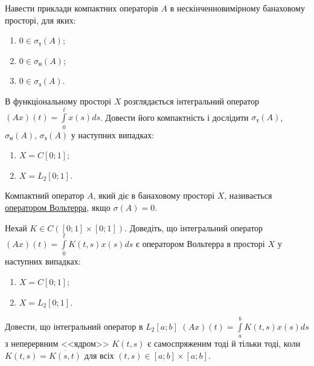 \begin{exercise}
    Навести приклади компактних операторів $A$ в нескінченновимірному
    банаховому просторі, для яких:
    \begin{enumerate}
        \item $0 \in \sigma_{\text{т}} (A)$;
        \item $0 \in \sigma_{\text{н}} (A)$;
        \item $0 \in \sigma_{\text{з}} (A)$.
    \end{enumerate}
\end{exercise}

\begin{exercise}
    В функціональному просторі $X$ розглядається інтегральний оператор 
    $(Ax)(t) = \int\limits_0^t x(s) ds$. Довести його компактність і дослідити
    $\sigma_{\text{т}} (A)$, $\sigma_{\text{н}} (A)$, $\sigma_{\text{з}} (A)$
    у наступних випадках:
    \begin{enumerate}
        \item $X = C[0;1]$;
        \item $X = L_2 [0;1]$.
    \end{enumerate}
\end{exercise}

\begin{theory}
    Компактний оператор $A$, який діє в банаховому просторі $X$, називається
    \ul{оператором Вольтерра}, якщо $\sigma(A) = 0$.
\end{theory}

\begin{exercise}
    Нехай $K \in C([0;1] \times [0;1])$. Доведіть, що інтегральний оператор
    $(Ax)(t) = \int\limits_0^t K(t,s) x(s)ds$ є оператором Вольтерра
    в просторі $X$ у наступних випадках:
    \begin{enumerate}
        \item $X = C[0;1]$;
        \item $X = L_2 [0;1]$. 
    \end{enumerate}
\end{exercise}

\begin{exercise}
    Довести, що інтегральний оператор в $L_2[a;b]$
    $(Ax)(t) = \int\limits_a^b K(t,s) x(s)ds$ з неперервним
    <<ядром>> $K(t,s)$ є самоспряженим тоді й тільки тоді, коли
    $K(t,s) = \overline{K(s,t)}$ для всіх $(t,s) \in [a;b] \times [a;b]$.
\end{exercise}

